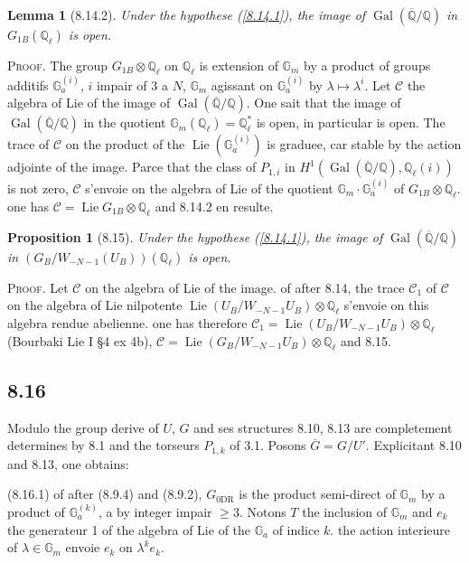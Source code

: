 \documentclass[12pt,a4paper]{article}
\theoremstyle{plain}
\newtheorem{lemma}[theorem]{Lemma}
\newtheorem{proposition}[theorem]{Proposition}
\theoremstyle{definition}
\theoremstyle{remark}
\DeclareMathOperator{\Lie}{Lie}
\DeclareMathOperator{\Gal}{Gal}
\newcommand{\Gm}{\mathbb{G}_m}
\newcommand{\Q}{\mathbb{Q}}
\newcommand{\DR}{\mathrm{DR}}
\begin{document}
\begin{lemma}[8.14.2]
Under the hypothese (\ref{8.14.1}), the image of $\Gal(\overline{\Q}/\Q)$ in $G_{1B}(\Q_\ell)$ is open.
\end{lemma}

\textsc{Proof.} The group $G_{1B} \otimes \Q_\ell$ on $\Q_\ell$ is extension of $\Gm$ by a product of groups additifs $\mathbb{G}_a^{(i)}$, $i$ impair of $3$ a $N$, $\Gm$ agissant on $\mathbb{G}_a^{(i)}$ by $\lambda \mapsto \lambda^i$. Let $\mathcal{C}$ the algebra of Lie of the image of $\Gal(\overline{\Q}/\Q)$. One sait that the image of $\Gal(\overline{\Q}/\Q)$ in the quotient $\Gm(\Q_\ell) = \Q_\ell^*$ is open, in particular is open. The trace of $\mathcal{C}$ on the product of the $\Lie(\mathbb{G}_a^{(i)})$ is graduee, car stable by the action adjointe of the image. Parce that the class of $P_{1,i}$ in $H^1(\Gal(\overline{\Q}/\Q), \Q_\ell(i))$ is not zero, $\mathcal{C}$ s'envoie on the algebra of Lie of the quotient $\Gm \cdot \mathbb{G}_a^{(i)}$ of $G_{1B} \otimes \Q_\ell$. one has $\mathcal{C} = \Lie G_{1B} \otimes \Q_\ell$ and 8.14.2 en resulte.

\begin{proposition}[8.15]
Under the hypothese (\ref{8.14.1}), the image of $\Gal(\overline{\Q}/\Q)$ in $(G_B/W_{-N-1}(U_B))(\Q_\ell)$ is open.
\end{proposition}

\textsc{Proof.} Let $\mathcal{C}$ on the algebra of Lie of the image. of after 8.14, the trace $\mathcal{C}_1$ of $\mathcal{C}$ on the algebra of Lie nilpotente $\Lie(U_B/W_{-N-1}U_B) \otimes \Q_\ell$ s'envoie on this algebra rendue abelienne. one has therefore $\mathcal{C}_1 = \Lie(U_B/W_{-N-1}U_B) \otimes \Q_\ell$ (Bourbaki Lie I \S 4 ex 4b), $\mathcal{C} = \Lie(G_B/W_{-N-1}U_B) \otimes \Q_\ell$ and 8.15.

\subsection*{8.16}

Modulo the group derive of $U$, $G$ and ses structures 8.10, 8.13 are completement determines by 8.1 and the torseurs $P_{1,k}$ of 3.1. Posons $\overline{G} = G/U'$. Explicitant 8.10 and 8.13, one obtains:

(8.16.1) of after (8.9.4) and (8.9.2), $G_{0\DR}$ is the product semi-direct of $\Gm$ by a product of $\mathbb{G}_a^{(k)}$, a by integer impair $\geq 3$. Notons $T$ the inclusion of $\Gm$ and $e_k$ the generateur 1 of the algebra of Lie of the $\mathbb{G}_a$ of indice $k$. the action interieure of $\lambda \in \Gm$ envoie $e_k$ on $\lambda^k e_k$.
\end{document}
